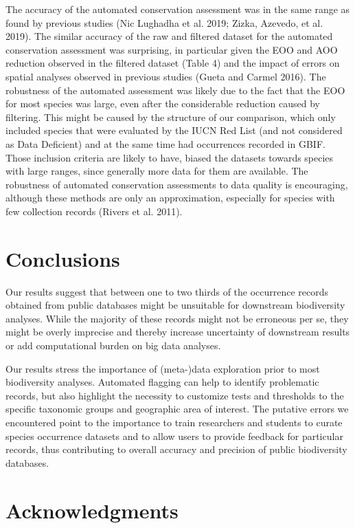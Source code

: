 \documentclass[fleqn,10pt,lineno]{wlpeerj} %
\begin{document}
The accuracy of the automated conservation assessment was in the same range as found by previous studies (Nic Lughadha et al. 2019; Zizka, Azevedo, et al. 2019). The similar accuracy of the raw and filtered dataset for the automated conservation assessment was surprising, in particular given the EOO and AOO reduction observed in the filtered dataset (Table 4) and the impact of errors on spatial analyses observed in previous studies (Gueta and Carmel 2016). The robustness of the automated assessment was likely due to the fact that the EOO for most species was large, even after the considerable reduction caused by filtering. This might be caused by the structure of our comparison, which only included species that were evaluated by the IUCN Red List (and not considered as Data Deficient) and at the same time had occurrences recorded in GBIF. Those inclusion criteria are likely to have, biased the datasets towards species with large ranges, since generally more data for them are available. The robustness of automated conservation assessments to data quality is encouraging, although these methods are only an approximation, especially for species with few collection records (Rivers et al. 2011).

\hypertarget{conclusions}{%
\section*{Conclusions}\label{conclusions}}

Our results suggest that between one to two thirds of the occurrence records obtained from public databases might be unsuitable for downstream biodiversity analyses. While the majority of these records might not be erroneous per se, they might be overly imprecise and thereby increase uncertainty of downstream results or add computational burden on big data analyses.

Our results stress the importance of (meta-)data exploration prior to most biodiversity analyses. Automated flagging can help to identify problematic records, but also highlight the necessity to customize tests and thresholds to the specific taxonomic groups and geographic area of interest. The putative errors we encountered point to the importance to train researchers and students to curate species occurrence datasets and to allow users to provide feedback for particular records, thus contributing to overall accuracy and precision of public biodiversity databases.

\hypertarget{acknowledgments}{%
\section*{Acknowledgments}\label{acknowledgments}}
\end{document}
